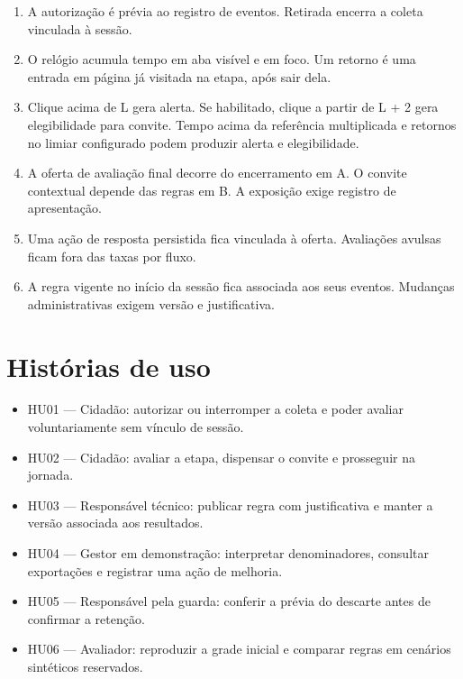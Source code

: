 \begin{apendicesenv}
\begin{enumerate}
\def\labelenumi{\arabic{enumi}.}

\item
  A autorização é prévia ao registro de eventos. Retirada encerra a coleta vinculada à sessão.
\item
  O relógio acumula tempo em aba visível e em foco. Um retorno é uma entrada em página já visitada na etapa, após sair dela.
\item
  Clique acima de L gera alerta. Se habilitado, clique a partir de L + 2 gera elegibilidade para convite. Tempo acima da referência multiplicada e retornos no limiar configurado podem produzir alerta e elegibilidade.
\item
  A oferta de avaliação final decorre do encerramento em A. O convite contextual depende das regras em B. A exposição exige registro de apresentação.
\item
  Uma ação de resposta persistida fica vinculada à oferta. Avaliações avulsas ficam fora das taxas por fluxo.
\item
  A regra vigente no início da sessão fica associada aos seus eventos. Mudanças administrativas exigem versão e justificativa.
\end{enumerate}

\section{Histórias de uso}
\label{sec:H.4}

\begin{itemize}

\item
  HU01 --- Cidadão: autorizar ou interromper a coleta e poder avaliar voluntariamente sem vínculo de sessão.
\item
  HU02 --- Cidadão: avaliar a etapa, dispensar o convite e prosseguir na jornada.
\item
  HU03 --- Responsável técnico: publicar regra com justificativa e manter a versão associada aos resultados.
\item
  HU04 --- Gestor em demonstração: interpretar denominadores, consultar exportações e registrar uma ação de melhoria.
\item
  HU05 --- Responsável pela guarda: conferir a prévia do descarte antes de confirmar a retenção.
\item
  HU06 --- Avaliador: reproduzir a grade inicial e comparar regras em cenários sintéticos reservados.
\end{itemize}


\end{apendicesenv}
